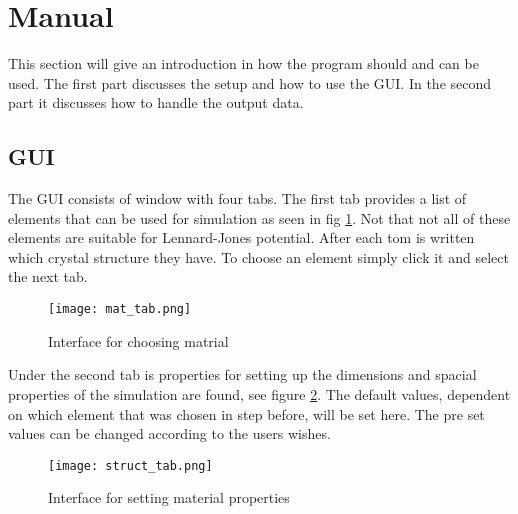 \section{Manual}
This section will give an introduction in how the program should and can be used. The first part discusses the setup and how to use the GUI. In the second part it discusses how to handle the output data.
	\subsection{GUI}
The GUI consists of window with four tabs. The first tab provides a list of elements that can be used for simulation as seen in fig \ref{fig:mat_tab}. Not that not all of these elements are suitable for Lennard-Jones potential. After each tom is written which crystal structure they have. To choose an element simply click it and select the next tab.
\begin{figure}[h!]
	\centering
	\texttt{[image: mat\_tab.png]}
	\caption{Interface for choosing matrial}
	\label{fig:mat_tab}
\end{figure}

Under the second tab is properties for setting up the dimensions and spacial properties of the simulation are found, see figure \ref{fig:struct_tab}. The default values, dependent on which element  that was chosen in step before, will be set here. The pre set values can be changed according to the users wishes.
\begin{figure}[h!]
	\centering
	\texttt{[image: struct\_tab.png]}
	\caption{Interface for setting material properties}
	\label{fig:struct_tab}
\end{figure}

